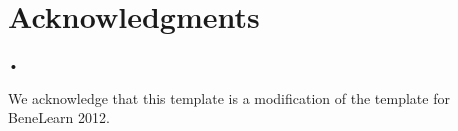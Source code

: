 \documentclass{article}
\begin{document}
\section*{Acknowledgments}
\begin{scriptsize}
{\footnotesize •}
\end{scriptsize}We acknowledge that this template is a modification of the template for BeneLearn 2012.




\end{document}
